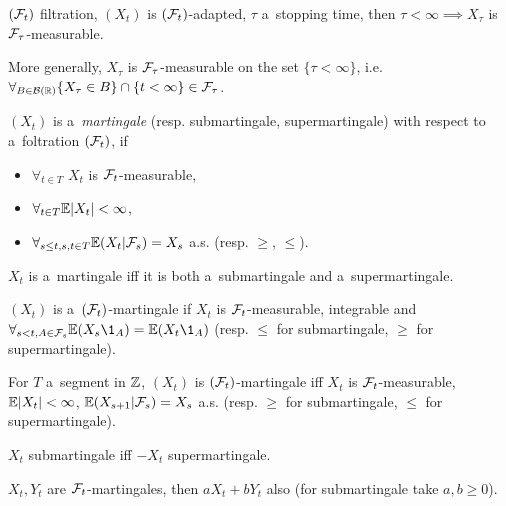 	\begin{proposition}
		$(\mathcal{F}_t)$ filtration, $(X_t)$ is $(\mathcal{F}_t)$-adapted, $\tau$ a~stopping time,
		then $\tau < \infty \implies X_\tau$ is $\mathcal{F}_\tau$-measurable.
		
		More generally, $X_\tau$ is $\mathcal{F}_\tau$-measurable on the set $\{\tau < \infty\}$,
		i.e. $\forall_{B \in \mathcal{B}(\mathbb{R})} \{X_\tau \in B\} \cap \{t < \infty\} \in \mathcal{F}_\tau$.
	\end{proposition}
	\pagebreak
	\begin{definition}[martingale]
		$(X_t)$ is a~\emph{martingale} (resp. submartingale, supermartingale)
		with respect to a~foltration $(\mathcal{F}_t)$, if 
		\begin{itemize}
			\item $\forall_{t \in T}$ $X_t$ is $\mathcal{F}_t$-measurable,
			\item $\forall_{t \in T} \mathbb{E} |X_t| < \infty$,
			\item $\forall_{s \leq t, s, t \in T} \mathbb{E}(X_t | \mathcal{F}_s) = X_s$ a.s. (resp. $\geq$, $\leq$).
		\end{itemize}
	\end{definition}
	
	\begin{remark}
		$X_t$ is a~martingale iff it is both a~submartingale and a~supermartingale.
	\end{remark}
	
	\begin{remark}
		$(X_t)$ is a~$(\mathcal{F}_t)$-martingale if $X_t$ is $\mathcal{F}_t$-measurable, integrable and $\forall_{s < t, A \in \F_s} \E(X_s \1_A) = \E(X_t \1_A)$ (resp. $\leq$ for submartingale, $\geq$ for supermartingale).
	\end{remark}
	
	\begin{remark}
		For $T$ a~segment in ${\mathbb{Z}}$, $(X_t)$ is $(\mathcal{F}_t)$-martingale iff
		$X_t$ is $\mathcal{F}_t$-measurable, $\mathbb{E}|X_t|<\infty$, $\mathbb{E}(X_{s+1} | \mathcal{F}_s) = X_s$ a.s. (resp. $\geq$ for submartingale, $\leq$ for supermartingale).
	\end{remark}
	
	\begin{remark}
		$X_t$ submartingale iff $-X_t$ supermartingale.
	\end{remark}
	
	\begin{remark}
		$X_t, Y_t$ are $\mathcal{F}_t$-martingales, then $a X_t + b Y_t$ also (for submartingale take $a, b \geq 0$).
	\end{remark}
	
